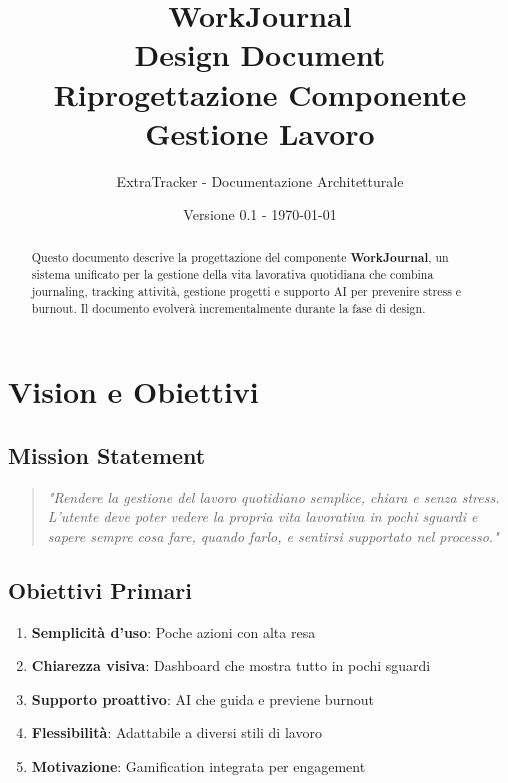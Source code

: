 \documentclass[11pt,a4paper]{article}
\title{\textbf{WorkJournal} \\ \Large Design Document \\ \vspace{0.5cm} \normalsize Riprogettazione Componente Gestione Lavoro}
\author{ExtraTracker - Documentazione Architetturale}
\date{Versione 0.1 - \today}
\begin{document}
\maketitle

\begin{abstract}
Questo documento descrive la progettazione del componente \textbf{WorkJournal}, 
un sistema unificato per la gestione della vita lavorativa quotidiana che combina 
journaling, tracking attività, gestione progetti e supporto AI per prevenire 
stress e burnout. Il documento evolverà incrementalmente durante la fase di design.
\end{abstract}

\tableofcontents
\newpage

\section{Vision e Obiettivi}

\subsection{Mission Statement}
\begin{quote}
\textit{"Rendere la gestione del lavoro quotidiano semplice, chiara e senza stress. 
L'utente deve poter vedere la propria vita lavorativa in pochi sguardi e sapere 
sempre cosa fare, quando farlo, e sentirsi supportato nel processo."}
\end{quote}

\subsection{Obiettivi Primari}

\begin{enumerate}
    \item \textbf{Semplicità d'uso}: Poche azioni con alta resa
    \item \textbf{Chiarezza visiva}: Dashboard che mostra tutto in pochi sguardi
    \item \textbf{Supporto proattivo}: AI che guida e previene burnout
    \item \textbf{Flessibilità}: Adattabile a diversi stili di lavoro
    \item \textbf{Motivazione}: Gamification integrata per engagement
\end{enumerate}
\end{document}
